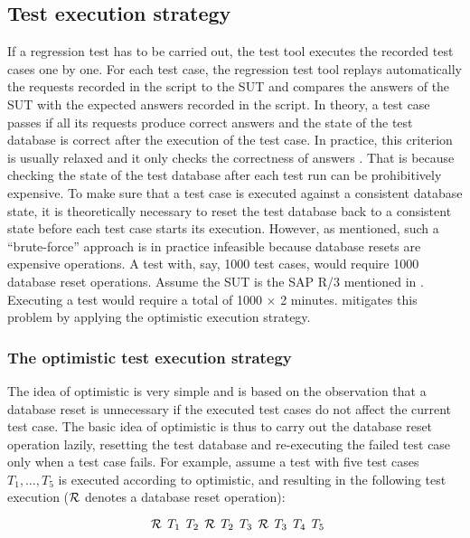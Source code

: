 \documentclass[authoryear,preprint,12pt]{elsarticle}
\begin{document}
  \subsection{Test execution strategy}
  \label{testexecutionstrategy}
If a regression test has to be carried out, the test tool executes the recorded test cases one by one.
For each test case, the regression test tool replays automatically the requests recorded in the script to the SUT
and compares the answers of the SUT with the expected answers recorded in the script.  
In theory, a test case passes if all its requests produce correct answers and the state of the
test database is correct after the execution of the test case. 
In practice, this criterion is usually relaxed and it only checks the correctness of answers \cite{cidr05}. 
That is because checking the state of the test database after each test run can be
prohibitively expensive.
To make sure that a test case is executed against a consistent database state,
it is theoretically necessary to reset the test database back to a consistent state before each test case starts its execution.
However, as mentioned, such a ``brute-force'' approach is in practice infeasible 
because database resets are expensive operations.  A test with, say, 1000 test cases,
would require 1000 database reset operations.
Assume the SUT is the SAP R/3 mentioned in \cite{cidr05}.
Executing a test would require a total of 1000 $\times$ 2 minutes.
\cite{cidr05} mitigates this problem by applying the {\sc optimistic} execution strategy.
      
      \subsubsection{The {\sc optimistic} test execution strategy}
The idea of {\sc optimistic} is very simple and is based on the observation that a database reset is unnecessary if 
the executed test cases do not affect the current test case.
The basic idea of {\sc optimistic} is thus to carry out the database reset operation lazily,
resetting the test database and re-executing the failed test case only when a test case fails.
For example, assume a test with five test cases $T_1, \ldots, T_5$ is executed 
according to {\sc optimistic}, and resulting in the following test execution ($\cal{R}$ denotes a database reset operation):

$$\:\:
{\cal R} \:\: T_1 \:\: T_2 \:\: {\cal R} \:\: T_2 \:\:  T_3 \:\: {\cal R} \:\: T_3 \:\: T_4 \:\:  T_5
$$
\end{document}
